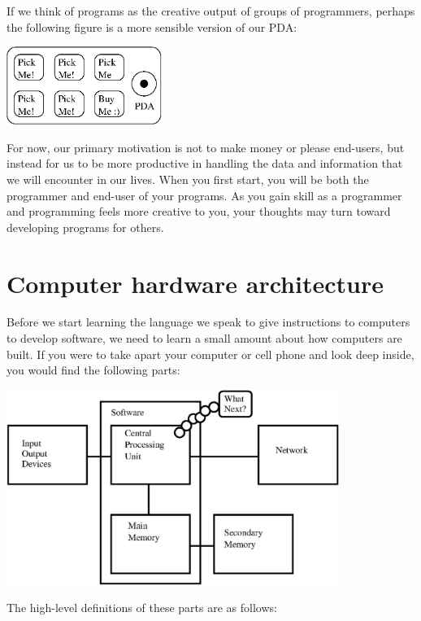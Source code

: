 \documentclass[11pt]{book}
\begin{document}
If we think of programs as the creative output of groups of programmers,
perhaps the following figure is a more sensible version of our PDA:

\beforefig
\centerline{\includegraphics[height=1.00in]{figs2/pda2.eps}}
\afterfig

For now, our primary motivation is not to make money or please end-users, but
instead for us to be more productive in handling the data and 
information that we will encounter in our lives.
When you first start, you will be both the programmer and end-user of
your programs.  As you gain skill as a programmer and
programming feels more creative to you, your thoughts may turn
toward developing programs for others.

\section{Computer hardware architecture}

Before we start learning the language we 
speak to give instructions to computers to 
develop software, we need to learn a small amount about 
how computers are built.  If you were to take
apart your computer or cell phone and look deep
inside, you would find the following parts:

\beforefig
\centerline{\includegraphics[height=2.50in]{figs2/arch.eps}}
\afterfig

The high-level definitions of these parts are as follows:
\end{document}
